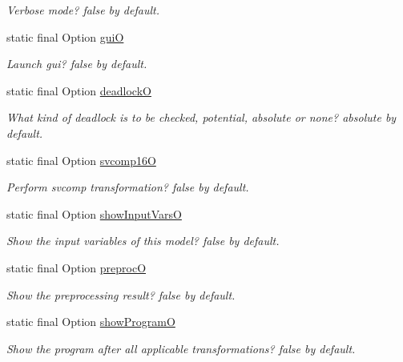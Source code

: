 \begin{DoxyCompactItemize}
\begin{DoxyCompactList}\small\item\em Verbose mode? false by default. \end{DoxyCompactList}\item 
static final Option \hyperlink{classedu_1_1udel_1_1cis_1_1vsl_1_1civl_1_1config_1_1IF_1_1CIVLConstants_a60e39f3b73f99f1a7756c4013b32ae7d}{gui\+O}
\begin{DoxyCompactList}\small\item\em Launch gui? false by default. \end{DoxyCompactList}\item 
static final Option \hyperlink{classedu_1_1udel_1_1cis_1_1vsl_1_1civl_1_1config_1_1IF_1_1CIVLConstants_a795542d3bb4e96bda6d434801756c06d}{deadlock\+O}
\begin{DoxyCompactList}\small\item\em What kind of deadlock is to be checked, potential, absolute or none? absolute by default. \end{DoxyCompactList}\item 
static final Option \hyperlink{classedu_1_1udel_1_1cis_1_1vsl_1_1civl_1_1config_1_1IF_1_1CIVLConstants_a5c03b5fbc54ce2a72f6a111b44d9f7db}{svcomp16\+O}
\begin{DoxyCompactList}\small\item\em Perform svcomp transformation? false by default. \end{DoxyCompactList}\item 
static final Option \hyperlink{classedu_1_1udel_1_1cis_1_1vsl_1_1civl_1_1config_1_1IF_1_1CIVLConstants_a01471f8516575754f52009463f995e99}{show\+Input\+Vars\+O}
\begin{DoxyCompactList}\small\item\em Show the input variables of this model? false by default. \end{DoxyCompactList}\item 
static final Option \hyperlink{classedu_1_1udel_1_1cis_1_1vsl_1_1civl_1_1config_1_1IF_1_1CIVLConstants_ad2ed38186416cf54acb98ebc637afca5}{preproc\+O}
\begin{DoxyCompactList}\small\item\em Show the preprocessing result? false by default. \end{DoxyCompactList}\item 
static final Option \hyperlink{classedu_1_1udel_1_1cis_1_1vsl_1_1civl_1_1config_1_1IF_1_1CIVLConstants_a8a10df909dd4d4228765dd0e66036dcd}{show\+Program\+O}
\begin{DoxyCompactList}\small\item\em Show the program after all applicable transformations? false by default. \end{DoxyCompactList}\item 

\end{DoxyCompactItemize}
